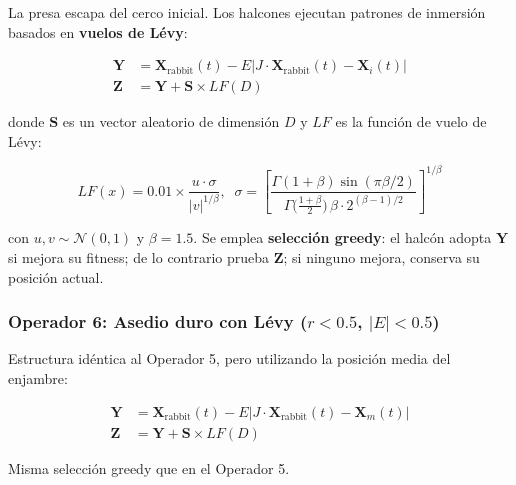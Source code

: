\documentclass[12pt,letterpaper]{article}
\begin{document}
La presa escapa del cerco inicial. Los halcones ejecutan patrones de inmersión basados en \textbf{vuelos de Lévy}:

\begin{formulabox}
\begin{align}
\mathbf{Y} &= \mathbf{X}_{\text{rabbit}}(t) - E \left| J \cdot \mathbf{X}_{\text{rabbit}}(t) - \mathbf{X}_i(t) \right| \label{eq:soft_levy_Y}\\[6pt]
\mathbf{Z} &= \mathbf{Y} + \mathbf{S} \times LF(D) \label{eq:soft_levy_Z}
\end{align}
\end{formulabox}

donde $\mathbf{S}$ es un vector aleatorio de dimensión $D$ y $LF$ es la función de vuelo de Lévy:

\begin{formulabox}
\begin{equation}
LF(x) = 0.01 \times \frac{u \cdot \sigma}{|v|^{1/\beta}}, \;\;
\sigma = \!\left[\frac{\Gamma(1\!+\!\beta)\sin(\pi\beta/2)}{\Gamma\!\bigl(\frac{1+\beta}{2}\bigr)\,\beta \cdot 2^{(\beta-1)/2}}\right]^{\!1/\beta}
\label{eq:levy}
\end{equation}
\end{formulabox}

con $u, v \sim \mathcal{N}(0,1)$ y $\beta = 1.5$. Se emplea \textbf{selección greedy}: el halcón adopta $\mathbf{Y}$ si mejora su fitness; de lo contrario prueba $\mathbf{Z}$; si ninguno mejora, conserva su posición actual.

\subsubsection{Operador 6: Asedio duro con Lévy (\texorpdfstring{$r < 0.5$, $|E| < 0.5$}{r<0.5, |E|<0.5})}

Estructura idéntica al Operador 5, pero utilizando la posición media del enjambre:

\begin{formulabox}
\begin{align}
\mathbf{Y} &= \mathbf{X}_{\text{rabbit}}(t) - E \left| J \cdot \mathbf{X}_{\text{rabbit}}(t) - \mathbf{X}_m(t) \right| \label{eq:hard_levy_Y}\\[6pt]
\mathbf{Z} &= \mathbf{Y} + \mathbf{S} \times LF(D) \label{eq:hard_levy_Z}
\end{align}
\end{formulabox}

Misma selección greedy que en el Operador 5.
\end{document}
